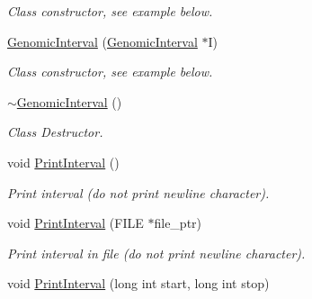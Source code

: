 \begin{CompactItemize}
\begin{CompactList}\small\item\em Class constructor, see example below. \item\end{CompactList}\item 
\hypertarget{classGenomicInterval_4132f8d27fa5ebe416abe41150974c14}{
\hyperlink{classGenomicInterval_4132f8d27fa5ebe416abe41150974c14}{GenomicInterval} (\hyperlink{classGenomicInterval}{GenomicInterval} $\ast$I)}
\label{classGenomicInterval_4132f8d27fa5ebe416abe41150974c14}

\begin{CompactList}\small\item\em Class constructor, see example below. \item\end{CompactList}\item 
\hypertarget{classGenomicInterval_632a255d16cb13b15b2f2d4f826cace7}{
\hyperlink{classGenomicInterval_632a255d16cb13b15b2f2d4f826cace7}{$\sim$GenomicInterval} ()}
\label{classGenomicInterval_632a255d16cb13b15b2f2d4f826cace7}

\begin{CompactList}\small\item\em Class Destructor. \item\end{CompactList}\item 
\hypertarget{classGenomicInterval_feba30dc21d2e5ed7e460eb1b79f021b}{
void \hyperlink{classGenomicInterval_feba30dc21d2e5ed7e460eb1b79f021b}{PrintInterval} ()}
\label{classGenomicInterval_feba30dc21d2e5ed7e460eb1b79f021b}

\begin{CompactList}\small\item\em Print interval (do not print newline character). \item\end{CompactList}\item 
\hypertarget{classGenomicInterval_968607fbfe88e86760924156f6519d98}{
void \hyperlink{classGenomicInterval_968607fbfe88e86760924156f6519d98}{PrintInterval} (FILE $\ast$file\_\-ptr)}
\label{classGenomicInterval_968607fbfe88e86760924156f6519d98}

\begin{CompactList}\small\item\em Print interval in file (do not print newline character). \item\end{CompactList}\item 
\hypertarget{classGenomicInterval_310800040ea4e328f5899611143caee0}{
void \hyperlink{classGenomicInterval_310800040ea4e328f5899611143caee0}{PrintInterval} (long int start, long int stop)}
\label{classGenomicInterval_310800040ea4e328f5899611143caee0}


\end{CompactItemize}

